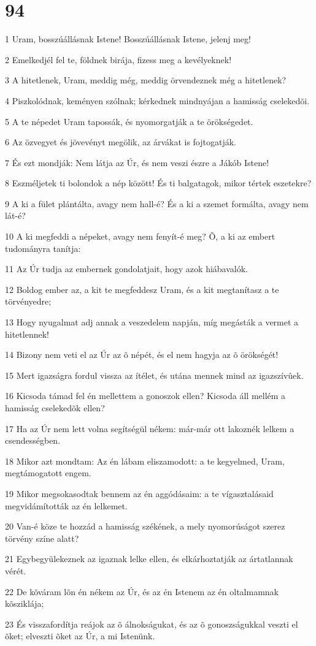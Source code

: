 \chapter{94}

\par 1 Uram, bosszúállásnak Istene! Bosszúállásnak Istene, jelenj meg!
\par 2 Emelkedjél fel te, földnek birája, fizess meg a kevélyeknek!
\par 3 A hitetlenek, Uram, meddig még, meddig örvendeznek még a hitetlenek?
\par 4 Piszkolódnak, keményen szólnak; kérkednek mindnyájan a hamisság cselekedõi.
\par 5 A te népedet Uram tapossák, és nyomorgatják a te örökségedet.
\par 6 Az özvegyet és jövevényt megölik, az árvákat is fojtogatják.
\par 7 És ezt mondják: Nem látja az Úr, és nem veszi észre a Jákób Istene!
\par 8 Eszméljetek ti bolondok a nép között! És ti balgatagok, mikor tértek eszetekre?
\par 9 A ki a fület plántálta, avagy nem hall-é? És a ki a szemet formálta, avagy nem lát-é?
\par 10 A ki megfeddi a népeket, avagy nem fenyít-é meg? Õ, a ki az embert tudományra tanítja:
\par 11 Az Úr tudja az embernek gondolatjait, hogy azok hiábavalók.
\par 12 Boldog ember az, a kit te megfeddesz Uram, és a kit megtanítasz a te törvényedre;
\par 13 Hogy nyugalmat adj annak a veszedelem napján, míg megásták a vermet a hitetlennek!
\par 14 Bizony nem veti el az Úr az õ népét, és el nem hagyja az õ örökségét!
\par 15 Mert igazságra fordul vissza az ítélet, és utána mennek mind az igazszívûek.
\par 16 Kicsoda támad fel én mellettem a gonoszok ellen? Kicsoda áll mellém a hamisság cselekedõk ellen?
\par 17 Ha az Úr nem lett volna segítségül nékem: már-már ott lakoznék lelkem a csendességben.
\par 18 Mikor azt mondtam: Az én lábam eliszamodott: a te kegyelmed, Uram, megtámogatott engem.
\par 19 Mikor megsokasodtak bennem az én aggódásaim: a te vígasztalásaid megvidámították az én lelkemet.
\par 20 Van-é köze te hozzád a hamisság székének, a mely nyomorúságot szerez törvény színe alatt?
\par 21 Egybegyülekeznek az igaznak lelke ellen, és elkárhoztatják az ártatlannak vérét.
\par 22 De kõváram lõn én nékem az Úr, és az én Istenem az én oltalmamnak kõsziklája;
\par 23 És visszafordítja reájok az õ álnokságukat, és az õ gonoszságukkal veszti el õket; elveszti õket az Úr, a mi Istenünk.

